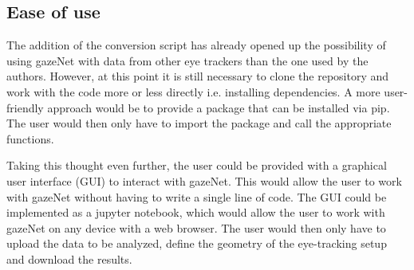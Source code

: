 \documentclass[conference]{IEEEtran}
\begin{document}
\subsection{Ease of use}
The addition of the conversion script has already opened up the possibility of using gazeNet with data from other eye trackers than the one used by the authors. However, at this point it is still necessary to clone the repository and work with the code more or less directly i.e. installing dependencies. A more user-friendly approach would be to provide a package that can be installed via pip. The user would then only have to import the package and call the appropriate functions.

Taking this thought even further, the user could be provided with a graphical user interface (GUI) to interact with gazeNet. This would allow the user to work with gazeNet without having to write a single line of code. The GUI could be implemented as a jupyter notebook, which would allow the user to work with gazeNet on any device with a web browser. The user would then only have to upload the data to be analyzed, define the geometry of the eye-tracking setup and download the results.



\end{document}
